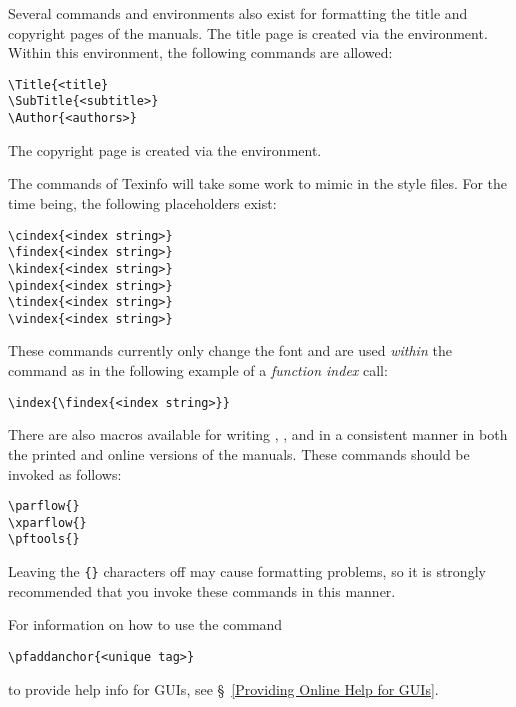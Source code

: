 Several commands and environments also exist for formatting the title
and copyright pages of the manuals.
The title page is created via the  environment.
Within this environment, the following commands are allowed:
\begin{display}\begin{verbatim}
\Title{<title}
\SubTitle{<subtitle>}
\Author{<authors>}
\end{verbatim}\end{display}
The copyright page is created via the  environment.

The  commands of Texinfo will take some work to mimic in
the \parflow{} style files.
For the time being, the following placeholders exist:
\begin{display}\begin{verbatim}
\cindex{<index string>}
\findex{<index string>}
\kindex{<index string>}
\pindex{<index string>}
\tindex{<index string>}
\vindex{<index string>}
\end{verbatim}\end{display}
These commands currently only change the font and are used {\em within}
the  command as in the following example of a
{\em function index} call:
\begin{display}\begin{verbatim}
\index{\findex{<index string>}}
\end{verbatim}\end{display}

There are also macros available for writing \parflow{}, \xparflow{},
and \pftools{} in a consistent manner in both the printed and online
versions of the manuals.
These commands should be invoked as follows:
\begin{display}\begin{verbatim}
\parflow{}
\xparflow{}
\pftools{}
\end{verbatim}\end{display}
Leaving the \verb#{}# characters off may cause formatting problems,
so it is strongly recommended that you invoke these commands in this
manner.

For information on how to use the command
\begin{display}\begin{verbatim}
\pfaddanchor{<unique tag>}
\end{verbatim}\end{display}
to provide help info for \parflow{} GUIs,
see \S~\ref{Providing Online Help for GUIs}.

